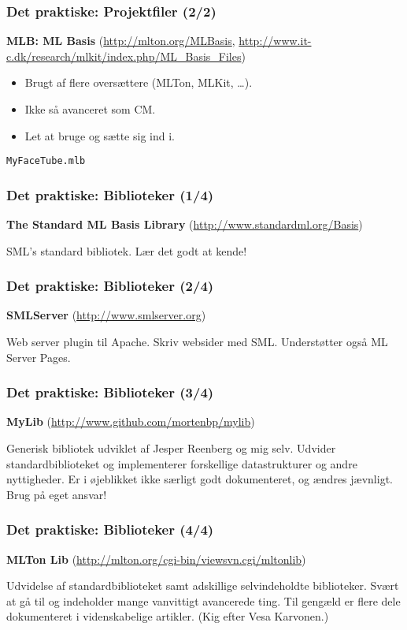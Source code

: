\documentclass[slidestop,compress,mathserif, xcolor=table]{beamer}
\begin{document}
\begin{frame}
  \frametitle{Det praktiske: Projektfiler \quad (2/2)}
  \textbf{MLB: ML Basis}
  {\scriptsize(\url{http://mlton.org/MLBasis},
    \url{http://www.it-c.dk/research/mlkit/index.php/ML_Basis_Files})}
  \begin{itemize}
  \item Brugt af flere oversættere (MLTon, MLKit, \ldots).
  \item Ikke så avanceret som CM.
  \item Let at bruge og sætte sig ind i.
  \end{itemize}
  \begin{block}{\texttt{MyFaceTube.mlb}}
    
  \end{block}
\end{frame}

\begin{frame}
  \frametitle{Det praktiske: Biblioteker \quad (1/4)}
  \textbf{The Standard ML Basis Library}
  {\scriptsize(\url{http://www.standardml.org/Basis})}
  \begin{block}{}
    SML's standard bibliotek. Lær det godt at kende!
  \end{block}
\end{frame}

\begin{frame}
  \frametitle{Det praktiske: Biblioteker \quad (2/4)}
  \textbf{SMLServer}
  {\scriptsize(\url{http://www.smlserver.org})}
  \begin{block}{}
    Web server plugin til Apache. Skriv websider med SML. Understøtter også ML
    Server Pages.
  \end{block}
\end{frame}

\begin{frame}
  \frametitle{Det praktiske: Biblioteker \quad (3/4)}
  \textbf{MyLib}
  {\scriptsize(\url{http://www.github.com/mortenbp/mylib})}
  \begin{block}{}
    Generisk bibliotek udviklet af Jesper Reenberg og mig selv. Udvider
    standardbiblioteket og implementerer forskellige datastrukturer og andre
    nyttigheder. Er i øjeblikket ikke særligt godt dokumenteret, og ændres
    jævnligt. Brug på eget ansvar!
  \end{block}
\end{frame}

\begin{frame}
  \frametitle{Det praktiske: Biblioteker \quad (4/4)}
  \textbf{MLTon Lib}
  {\scriptsize(\url{http://mlton.org/cgi-bin/viewsvn.cgi/mltonlib})}
  \begin{block}{}
    Udvidelse af standardbiblioteket samt adskillige selvindeholdte
    biblioteker. Svært at gå til og indeholder mange vanvittigt avancerede
    ting. Til gengæld er flere dele dokumenteret i videnskabelige
    artikler. (Kig efter Vesa Karvonen.)
  \end{block}
\end{frame}
\end{document}
